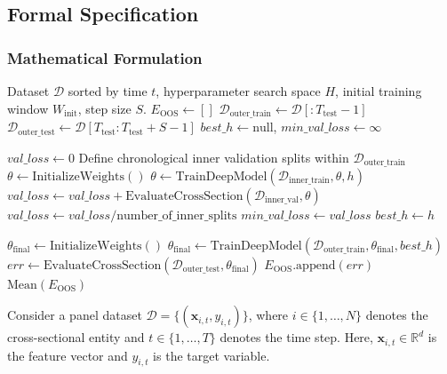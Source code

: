 \subsection{Formal Specification}

\subsubsection{Mathematical Formulation}

\begin{algorithm}[H]
	\captionsetup{font=small}
	\caption{Nested Walk-Forward Cross-Sectional Validation Pseudocode}
	\begin{algorithmic}[1]\footnotesize
		\Require Dataset $\mathcal{D}$ sorted by time $t$, hyperparameter search space $H$, initial training window $W_{\mathrm{init}}$, step size $S$.
		\State $E_{\mathrm{OOS}} \gets []$ 
		\State $\mathcal{D}_{\mathrm{outer\_train}} \gets \mathcal{D}[:T_{\mathrm{test}}-1]$
		\State $\mathcal{D}_{\mathrm{outer\_test}} \gets \mathcal{D}[T_{\mathrm{test}}:T_{\mathrm{test}}+S-1]$
		\State $best\_h \gets \mathrm{null}$, $min\_val\_loss \gets \infty$

		 
		\State $val\_loss \gets 0$
		\State Define chronological inner validation splits within $\mathcal{D}_{\mathrm{outer\_train}}$
		\State $\theta \gets \mathrm{InitializeWeights}()$
		\State $\theta \gets \mathrm{TrainDeepModel}(\mathcal{D}_{\mathrm{inner\_train}}, \theta, h)$
		\State $val\_loss \gets val\_loss + \mathrm{EvaluateCrossSection}(\mathcal{D}_{\mathrm{inner\_val}}, \theta)$
		\EndFor
		\State $val\_loss \gets val\_loss / \mathrm{number\_of\_inner\_splits}$
		\State $min\_val\_loss \gets val\_loss$
		\State $best\_h \gets h$
		\EndIf
		\EndFor

		\State {}
		\State $\theta_{\mathrm{final}} \gets \mathrm{InitializeWeights}()$
		\State $\theta_{\mathrm{final}} \gets \mathrm{TrainDeepModel}(\mathcal{D}_{\mathrm{outer\_train}}, \theta_{\mathrm{final}}, best\_h)$
		\State $err \gets \mathrm{EvaluateCrossSection}(\mathcal{D}_{\mathrm{outer\_test}}, \theta_{\mathrm{final}})$
		\State $E_{\mathrm{OOS}}.\mathrm{append}(err)$
		\EndFor
		\State \Return $\mathrm{Mean}(E_{\mathrm{OOS}})$
	\end{algorithmic}
\end{algorithm}
Consider a panel dataset $\mathcal{D} = \{(\mathbf{x}_{i,t}, y_{i,t})\}$, where $i \in \{1,\dots,N\}$ denotes the cross-sectional entity and $t \in \{1,\dots,T\}$ denotes the time step. Here, $\mathbf{x}_{i,t} \in \mathbb{R}^d$ is the feature vector and $y_{i,t}$ is the target variable.

